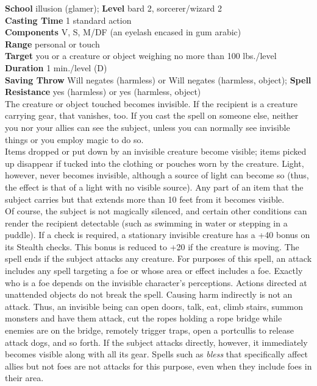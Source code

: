 \textbf{School} illusion (glamer); \textbf{Level} bard 2, sorcerer/wizard 2\\
\textbf{Casting Time} 1 standard action\\
\textbf{Components} V, S, M/DF (an eyelash encased in gum arabic)\\
\textbf{Range} personal or touch\\
\textbf{Target} you or a creature or object weighing no more than 100 lbs./level\\
\textbf{Duration} 1 min./level (D)\\
\textbf{Saving Throw }Will negates (harmless) or Will negates (harmless, object); \textbf{Spell Resistance} yes (harmless) or yes (harmless, object)\\
The creature or object touched becomes invisible. If the recipient is a creature carrying gear, that vanishes, too. If you cast the spell on someone else, neither you nor your allies can see the subject, unless you can normally see invisible things or you employ magic to do so.\\
Items dropped or put down by an invisible creature become visible; items picked up disappear if tucked into the clothing or pouches worn by the creature. Light, however, never becomes invisible, although a source of light can become so (thus, the effect is that of a light with no visible source). Any part of an item that the subject carries but that extends more than 10 feet from it becomes visible.\\
Of course, the subject is not magically silenced\textit{, }and certain other conditions can render the recipient detectable (such as swimming in water or stepping in a puddle). If a check is required, a stationary invisible creature has a +40 bonus on its Stealth checks. This bonus is reduced to +20 if the creature is moving. The spell ends if the subject attacks any creature. For purposes of this spell, an attack includes any spell targeting a foe or whose area or effect includes a foe. Exactly who is a foe depends on the invisible character's perceptions. Actions directed at unattended objects do not break the spell. Causing harm indirectly is not an attack. Thus, an invisible being can open doors, talk, eat, climb stairs, summon monsters and have them attack, cut the ropes holding a rope bridge while enemies are on the bridge, remotely trigger traps, open a portcullis to release attack dogs, and so forth. If the subject attacks directly, however, it immediately becomes visible along with all its gear. Spells such as \textit{bless }that specifically affect allies but not foes are not attacks for this purpose, even when they include foes in their area.\\
